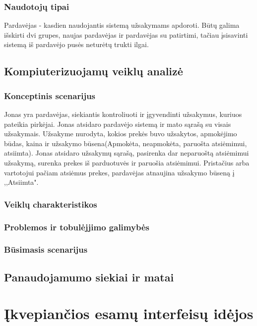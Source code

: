 \documentclass[oneside]{VUMIFPSkursinis}
\begin{document}
		\subsubsection{Naudotojų tipai}
			Pardavėjas - kasdien naudojantis sistemą užsakymams apdoroti. Būtų galima išskirti dvi grupes, naujas pardavėjas ir pardavėjas su patirtimi, tačiau įsisavinti sistemą iš pardavėjo pusės neturėtų trukti ilgai.
	\subsection{Kompiuterizuojamų veiklų analizė}
		\subsubsection{Konceptinis scenarijus}
			Jonas yra pardavėjas, siekiantis kontroliuoti ir įgyvendinti užsakymus, kuriuos pateikia pirkėjai. Jonas atsidaro pardavėjo sistemą ir mato sąrašą su visais užsakymais. Užsakyme nurodyta, kokios prekės buvo užsakytos, apmokėjimo būdas, kaina ir užsakymo būsena(Apmokėta, neapmokėta, paruošta atsiėmimui, atsiimta). Jonas atsidaro užsakymų sąrašą, pasirenka dar neparuoštą atsiėmimui užsakymą, surenka prekes iš parduotuvės ir paruošia atsiėmimui. Pristačius arba vartotojui pačiam atsiėmus prekes, pardavėjas atnaujina užsakymo būseną į ,,Atsiimta". 
		\subsubsection{Veiklų charakteristikos}
				
		\subsubsection{Problemos ir tobulėjjimo galimybės}
		\subsubsection{Būsimasis scenarijus}
	\subsection{Panaudojamumo siekiai ir matai}

\section{Įkvepiančios esamų interfeisų idėjos}
\end{document}
